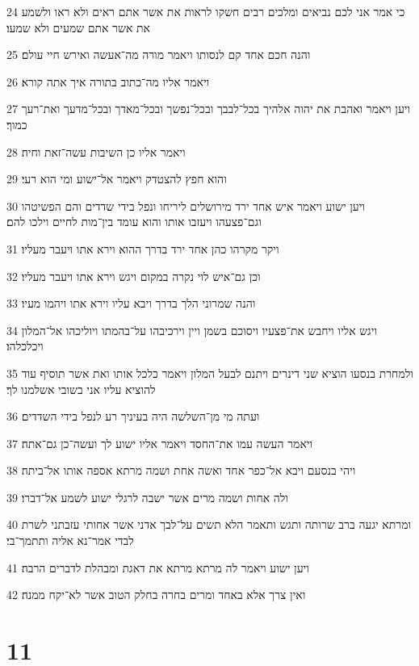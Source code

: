 \par 24 כי אמר אני לכם נביאים ומלכים רבים חשקו לראות את אשר אתם ראים ולא ראו ולשמע את אשר אתם שמעים ולא שמעו׃
\par 25 והנה חכם אחד קם לנסותו ויאמר מורה מה־אעשה ואירש חיי עולם׃
\par 26 ויאמר אליו מה־כתוב בתורה איך אתה קורא׃
\par 27 ויען ויאמר ואהבת את יהוה אלהיך בכל־לבבך ובכל־נפשך ובכל־מאדך ובכל־מדעך ואת־רעך כמוך׃
\par 28 ויאמר אליו כן השיבות עשה־זאת וחיה׃
\par 29 והוא חפץ להצטדק ויאמר אל־ישוע ומי הוא רעי׃
\par 30 ויען ישוע ויאמר איש אחד ירד מירושלים ליריחו ונפל בידי שדדים והם הפשיטהו וגם־פצעהו ויעזבו אותו והוא עומד בין־מות לחיים וילכו להם׃
\par 31 ויקר מקרהו כהן אחד ירד בדרך ההוא וירא אתו ויעבר מעליו׃
\par 32 וכן גם־איש לוי נקרה במקום ויגש וירא אתו ויעבר מעליו׃
\par 33 והנה שמרוני הלך בדרך ויבא עליו וירא אתו ויהמו מעיו׃
\par 34 ויגש אליו ויחבש את־פצעיו ויסוכם בשמן ויין וירכיבהו על־בהמתו ויוליכהו אל־המלון ויכלכלהו׃
\par 35 ולמחרת בנסעו הוציא שני דינרים ויתנם לבעל המלון ויאמר כלכל אותו ואת אשר תוסיף עוד להוציא עליו אני בשובי אשלמנו לך׃
\par 36 ועתה מי מן־השלשה היה בעיניך רע לנפל בידי השדדים׃
\par 37 ויאמר העשה עמו את־החסד ויאמר אליו ישוע לך ועשה־כן גם־אתה׃
\par 38 ויהי בנסעם ויבא אל־כפר אחד ואשה אחת ושמה מרתא אספה אותו אל־ביתה׃
\par 39 ולה אחות ושמה מרים אשר ישבה לרגלי ישוע לשמע אל־דברו׃
\par 40 ומרתא יגעה ברב שרותה ותגש ותאמר הלא תשים על־לבך אדני אשר אחותי עזבתני לשרת לבדי אמר־נא אליה ותתמך־בי׃
\par 41 ויען ישוע ויאמר לה מרתא מרתא את דאגת ומבהלת לדברים הרבה׃
\par 42 ואין צרך אלא באחד ומרים בחרה בחלק הטוב אשר לא־יקח ממנה׃

\chapter{11}

